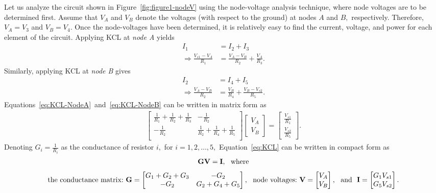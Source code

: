 Let us analyze the circuit shown in Figure~\ref{fig:figure1-nodeV} using the node-voltage analysis technique, where node voltages are to be determined first. Assume that $V_A$ and $V_B$ denote the voltages (with respect to the ground) at nodes $A$ and $B,$ respectively. Therefore, $V_A=V_3$ and $V_B=V_4.$ Once the node-voltages have been  determined, it is relatively easy to find the current, voltage, and power for each element of the circuit. Applying KCL at \emph{node A} yields %
%
\begin{align}
  I_1 &= I_2 + I_3\\
  \Rightarrow\frac{V_{s1} - V_A}{R_1} &= \frac{V_A-V_B}{R_2} + \frac{V_A}{R_3}.
  \label{eq:KCL-NodeA}
\end{align}
%
Similarly, applying KCL at \emph{node B} gives %
%
\begin{align}
  I_2 & = I_4+I_5\\
  \Rightarrow\frac{V_A - V_B}{R_2} &= \frac{V_B}{R_4} + \frac{V_B-V_{s2}}{R_5}.
  \label{eq:KCL-NodeB}
\end{align}
%
Equations~\eqref{eq:KCL-NodeA}~and~\eqref{eq:KCL-NodeB} can be written in matrix form as %
%
\begin{align}
  \begin{bmatrix}
    \frac{1}{R_1}+\frac{1}{R_2}+\frac{1}{R_3} & -\frac{1}{R_2}\\
    -\frac{1}{R_2} & \frac{1}{R_2}+\frac{1}{R_4}+\frac{1}{R_5}\\    
  \end{bmatrix}
  \begin{bmatrix}
    V_A\\
    V_B
  \end{bmatrix}
  =
  \begin{bmatrix}
    \frac{V_{s1}}{R_1}\\
    \frac{V_{s2}}{R_5}    
  \end{bmatrix}.
  \label{eq:KCL}
\end{align}
%
Denoting $G_i=\frac{1}{R_i}$ as the conductance of resistor $i,$ for $i=1,2,\ldots, 5,$ Equation~\eqref{eq:KCL} can be written in compact form as %
%
\begin{align}
  {\bf G}{\bf V} = {\bf I},~~\text{where}
  \label{eq:nodeVoltage}
\end{align}
%
\begin{align*}
  \text{the conductance matrix:~}{\bf G} =
    \begin{bmatrix}
    G_1+G_2+G_3 & -G_2\\
    -G_2 & G_2+G_4+G_5\\    
  \end{bmatrix}
  ,~~\text{node voltages:~}
  {\bf V} =
  \begin{bmatrix}
    V_A\\
    V_B
  \end{bmatrix}
  ,~~\text{and}~~
  {\bf I} =
    \begin{bmatrix}
    G_1V_{s1}\\
    G_5V_{s2}    
  \end{bmatrix}.
\end{align*}

